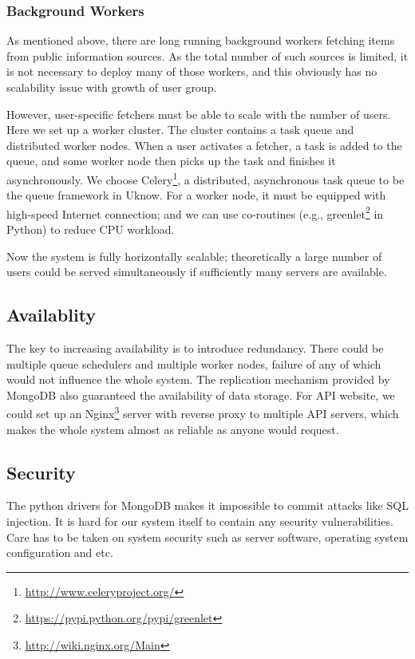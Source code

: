\subsubsection{Background Workers}

As mentioned above, there are long running background workers fetching
items from public information sources. As the total number of such
sources is limited, it is not necessary to deploy many of those workers, and this
obviously has no scalability issue with growth of user group.

However, user-specific fetchers must be able to scale with the number of
users. Here we set up a worker cluster. The cluster contains a task
queue and distributed worker nodes. When a user activates a fetcher, a
task is added to the queue, and some worker node then picks up the task
and finishes it asynchronously. We choose
Celery\footnote{\url{http://www.celeryproject.org/}}, a distributed, asynchronous task queue to be the queue framework in Uknow.
For a worker node, it must be equipped with high-speed Internet
connection; and we can use co-routines (e.g., greenlet\footnote{\url{https://pypi.python.org/pypi/greenlet}} in Python)
to reduce CPU workload.

Now the system is fully horizontally scalable; theoretically a large
number of users could be served simultaneously if sufficiently many
servers are available.

\subsection{Availablity}

The key to increasing availability is to introduce redundancy. There
could be multiple queue schedulers and multiple worker nodes, failure of
any of which would not influence the whole system. The replication
mechanism provided by MongoDB also guaranteed the availability of data
storage. For API website, we could set up an Nginx\footnote{\url{http://wiki.nginx.org/Main}} server with reverse
proxy to multiple API servers, which makes the whole system almost as
reliable as anyone would request.

\subsection{Security}

The python drivers for MongoDB makes it impossible to commit attacks like SQL
injection. It is hard for our system itself to contain any security
vulnerabilities. Care has to be taken on system security such as server
software, operating system configuration and etc.
